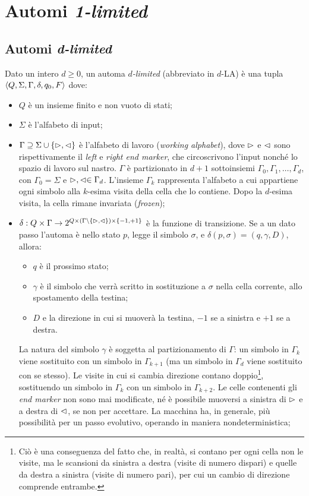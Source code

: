 \chapter{Automi \emph{1-limited}}



\section{Automi \emph{d-limited}}
\begin{defin}
	Dato un intero $d\geq 0$, un automa \emph{$d$-limited} (abbreviato in $d$-LA) è una tupla $\langle Q,\Sigma,\Gamma,\delta,q_0,F \rangle$ dove:
	\begin{itemize}
		\item $Q$ è un insieme finito e non vuoto di stati;
		\item $\Sigma$ è l'alfabeto di input;
		\item $\Gamma\supseteq\Sigma\cup\left\{ \vartriangleright,\vartriangleleft \right\}$ è l'alfabeto di lavoro (\emph{working alphabet}), dove $\vartriangleright$ e $\vartriangleleft$ sono rispettivamente il \emph{left} e \emph{right end marker}, che circoscrivono l'input nonché lo spazio di lavoro sul nastro. $\Gamma$ è partizionato in $d+1$ sottoinsiemi $\Gamma_0,\Gamma_1,\dots,\Gamma_d$, con $\Gamma_0=\Sigma$ e $\vartriangleright,\vartriangleleft\in\Gamma_d$. L'insieme $\Gamma_k$ rappresenta l'alfabeto a cui appartiene ogni simbolo alla $k$-esima visita della cella che lo contiene. Dopo la $d$-esima visita, la cella rimane invariata (\emph{frozen});
		\item $\delta:Q\times\Gamma\to 2^{Q\times(\Gamma\setminus\left\{ \vartriangleright,\vartriangleleft \right\})\times\left\{ -1,+1 \right\}}$ è la funzione di transizione. Se a un dato passo l'automa è nello stato $p$, legge il simbolo $\sigma$, e $\delta(p,\sigma)=(q,\gamma,D)$, allora:
			\begin{itemize}
				\item $q$ è il prossimo stato;
				\item $\gamma$ è il simbolo che verrà scritto in sostituzione a $\sigma$ nella cella corrente, allo spostamento della testina;
				\item $D$ e la direzione in cui si muoverà la testina, $-1$ se a sinistra e $+1$ se a destra.
			\end{itemize}
			La natura del simbolo $\gamma$ è soggetta al partizionamento di $\Gamma$: un simbolo in $\Gamma_k$ viene sostituito con un simbolo in $\Gamma_{k+1}$ (ma un simbolo in $\Gamma_d$ viene sostituito con se stesso). Le visite in cui si cambia direzione contano doppio\footnote{Ciò è una conseguenza del fatto che, in realtà, si contano per ogni cella non le visite, ma le scansioni da sinistra a destra (visite di numero dispari) e quelle da destra a sinistra (visite di numero pari), per cui un cambio di direzione comprende entrambe.}, sostituendo un simbolo in $\Gamma_k$ con un simbolo in $\Gamma_{k+2}$. Le celle contenenti gli \emph{end marker} non sono mai modificate, né è possibile muoversi a sinistra di $\vartriangleright$ e a destra di $\vartriangleleft$, se non per accettare. La macchina ha, in generale, più possibilità per un passo evolutivo, operando in maniera nondeterministica;

\end{itemize}
\end{defin}
